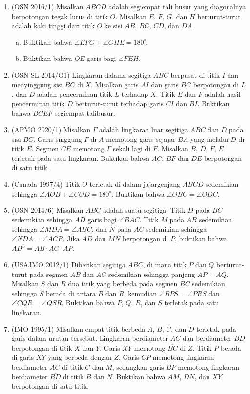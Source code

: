 \documentclass[12pt]{scrartcl}
\begin{document}
\begin{enumerate}
\item (OSN 2016/1) Misalkan $ABCD$ adalah segiempat tali busur yang diagonalnya berpotongan tegak lurus di titik $O$. Misalkan $E$, $F$, $G$, dan $H$ berturut-turut adalah kaki tinggi dari titik $O$ ke sisi $AB$, $BC$, $CD$, dan $DA$.
\begin{enumerate}[(a).]
\item Buktikan bahwa $\angle EFG+\angle GHE=180^\circ$.
\item Buktikan bahwa $OE$ garis bagi $\angle FEH$.
\end{enumerate}
\item (OSN SL 2014/G1) Lingkaran dalama segitiga $ABC$ berpusat di titik $I$ dan menyinggung sisi $BC$ di $X$. Misalkan garis $AI$ dan garis $BC$ berpotongan di $L$, dan $D$ adalah pencerminan titik $L$ terhadap $X$. Titik $E$ dan $F$ adalah hasil pencerminan titik $D$ berturut-turut terhadap garis $CI$ dan $BI$. Buktikan bahwa $BCEF$ segiempat talibusur.
\item(APMO 2020/1) Misalkan $\Gamma$ adalah lingkaran luar segitiga $ABC$ dan $D$ pada sisi $BC$. Garis singgung $\Gamma$ di $A$ memotong garis sejajar $BA$ yang melalui $D$ di titik $E$. Segmen $CE$ memotong $\Gamma$ sekali lagi di $F$. Misalkan $B$, $D$, $F$, $E$ terletak pada satu lingkaran. Buktikan bahwa $AC$, $BF$ dan $DE$ berpotongan di satu titik.
\item (Canada 1997/4) Titik $O$ terletak di dalam jajargenjang $ABCD$ sedemikian sehingga $\angle AOB+\angle COD=180^\circ$. Buktikan bahwa $\angle OBC=\angle ODC$.
\item (OSN 2014/6) Misalkan $ABC$ adalah suatu segitiga. Titik $D$ pada $BC$ sedemikian sehingga $AD$ garis bagi $\angle BAC$. Titik $M$ pada $AB$ sedemikian sehingga $\angle MDA=\angle ABC$, dan $N$ pada $AC$ sedemikian sehingga $\angle NDA=\angle ACB$. Jika $AD$ dan $MN$ berpotongan di $P$, buktikan bahwa $AD^3=AB\cdot AC\cdot AP$.
\item (USAJMO 2012/1) Diberikan segitiga $ABC$, di mana titik $P$ dan $Q$ berturut-turut pada segmen $AB$ dan $AC$ sedemikian sehingga panjang $AP=AQ$. Misalkan $S$ dan $R$ dua titik yang berbeda pada segmen $BC$ sedemikian sehingga $S$ berada di antara $B$ dan $R$, kemudian $\angle BPS=\angle PRS$ dan $\angle CQR=\angle QSR$. Buktikan bahwa $P$, $Q$, $R$, dan $S$ terletak pada satu lingkaran.
\item (IMO 1995/1) Misalkan empat titik berbeda $A$, $B$, $C$, dan $D$ terletak pada garis dalam urutan tersebut. Lingkaran berdiameter $\overline{AC}$ dan berdiameter $\overline{BD}$ berpotongan di titik $X$ dan $Y$. Garis $XY$ memotong $\overline{BC}$ di $Z$. Titik $P$ berada di garis $XY$ yang berbeda dengan $Z$. Garis $CP$ memotong lingkaran berdiameter $AC$ di titik $C$ dan $M$, sedangkan garis $BP$ memotong lingkaran berdiameter $\overline{BD}$ di titik $B$ dan $N$. Buktikan bahwa $AM$, $DN$, dan $XY$ berpotongan di satu titik.

\end{enumerate}
\end{document}
